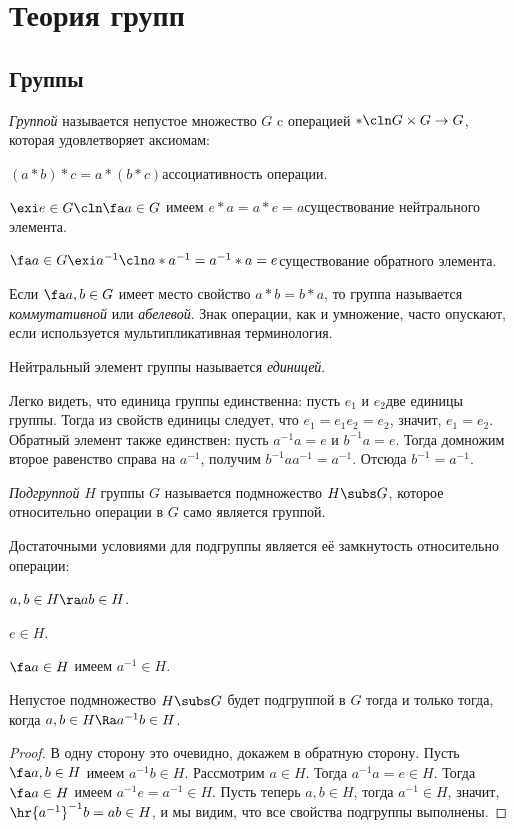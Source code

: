 \documentclass[a4paper]{article}
\begin{document}
\pagebreak

\section{Теория групп}

\subsection{Группы}

\begin{df}
\emph{Группой} называется непустое множество $G$ c операцией $*\cln G \times G \to G$, которая удовлетворяет
аксиомам:

 $(a*b)*c=a*(b*c)$\т ассоциативность операции.

 $\exi e \in G\cln \fa a \in G$ имеем $e*a=a*e=a$\т существование нейтрального элемента.

 $\fa a \in G \exi a^{-1}\cln a*a^{-1}=a^{-1}*a=e$\т существование обратного элемента.

Если $\fa a,b \in G$ имеет место свойство $a*b=b*a$, то группа называется \emph{коммутативной}
или \emph{абелевой}. Знак операции,
как и умножение, часто опускают, если используется мультипликативная терминология.

Нейтральный элемент группы называется \emph{единицей}.
\end{df}

Легко видеть, что единица группы единственна: пусть $e_1$ и $e_2$\т две единицы
группы. Тогда из свойств единицы следует, что $e_1 = e_1e_2 =
e_2$, значит, $e_1=e_2$. Обратный элемент также единствен: пусть
$a^{-1}a=e$ и $b^{-1}a=e$. Тогда домножим второе равенство справа
на $a^{-1}$, получим $b^{-1}aa^{-1}=a^{-1}$. Отсюда
$b^{-1}=a^{-1}$.

\begin{df}
\emph{Подгруппой} $H$ группы $G$ называется подмножество $H\subs G$,
которое относительно операции в $G$ само является группой.
\end{df}

Достаточными условиями для подгруппы является её замкнутость
относительно операции:

 $a, b \in H \ra ab \in H$.

 $e \in H$.

 $\fa a \in H$ имеем $a^{-1} \in H$.

\begin{stm}
Непустое подмножество $H \subs G$ будет подгруппой в $G$ тогда и только тогда, когда
$a, b \in H \Ra a^{-1}b \in H$.
\end{stm}
\begin{proof}
В одну сторону это очевидно, докажем в обратную сторону. Пусть $\fa a, b \in H$ имеем $a^{-1}b \in H$. Рассмотрим
$a \in H$. Тогда $a^{-1}a = e \in H$. Тогда $\fa a \in H$ имеем $a^{-1}e = a^{-1} \in H$.
Пусть теперь $a, b \in H$, тогда $a^{-1} \in H$, значит, $\hr{a^{-1}}^{-1}b=ab \in H$, и мы видим,
что все свойства подгруппы выполнены.
\end{proof}
\end{document}
